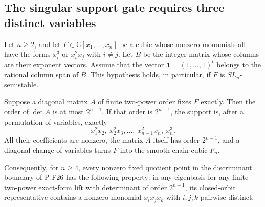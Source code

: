 \subsection{The singular support gate requires three distinct variables}

\begin{proposition}
\label{prop:cubicgraphsupport}
Let $n\ge2$, and let $F\in\mathbb C[x_1,\ldots,x_n]$ be a
cubic whose nonzero monomials all have the forms $x_i^3$ or
$x_i^2x_j$ with $i\ne j$. Let $B$ be the integer matrix whose
columns are their exponent vectors. Assume that the vector
$\mathbf1=(1,\ldots,1)^t$ belongs to the rational column span
of $B$. This hypothesis holds, in particular, if $F$ is
$SL_n$-semistable.

Suppose a diagonal matrix $A$ of finite two-power order fixes
$F$ exactly. Then the order of $\det A$ is at most $2^{n-1}$.
If that order is $2^{n-1}$, the support is, after a permutation
of variables, exactly
\[
 x_1^2x_2,\ x_2^2x_3,\ldots,\ x_{n-1}^2x_n,\ x_n^3.
 \tag{P-F27a}
\]
All their coefficients are nonzero, the matrix $A$ itself has
order $2^{n-1}$, and a diagonal change of variables turns $F$
into the smooth chain cubic $F_n$.

Consequently, for $n\ge4$, every nonzero fixed quotient point
in the discriminant boundary of P-F26 has the following
property: in any eigenbasis for any finite two-power
exact-form lift with determinant of order $2^{n-1}$, its
closed-orbit representative contains a nonzero monomial
$x_ix_jx_k$ with $i,j,k$ pairwise distinct.
\end{proposition}

